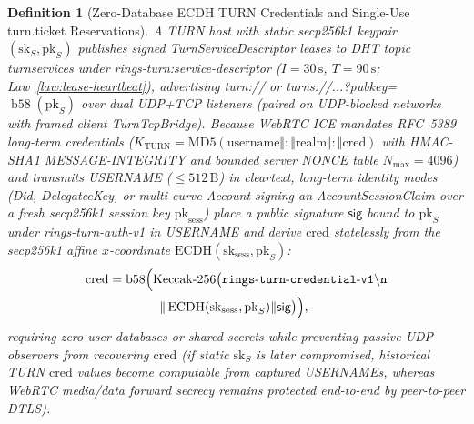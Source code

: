 \documentclass[journal]{IEEEtran}
\newtheorem{definition}{Definition}
\DeclareRobustCommand{\code}[1]{{\ttfamily\renewcommand{\_}{\textunderscore\allowbreak}#1}}
\begin{document}
\begin{definition}[Zero-Database ECDH TURN Credentials and Single-Use \code{turn.ticket} Reservations]\label{def:turn-ticket}
A TURN host with static secp256k1 keypair $(\mathrm{sk}_S,\mathrm{pk}_S)$ publishes signed \code{TurnServiceDescriptor} leases to DHT topic \code{turn\_services} under \code{rings-turn:service-descriptor} ($I=30\,\mathrm{s}$, $T=90\,\mathrm{s}$; Law~\ref{law:lease-heartbeat}), advertising \code{turn://} or \code{turns://...?pubkey=}$\operatorname{b58}(\mathrm{pk}_S)$ over dual UDP+TCP listeners (paired on UDP-blocked networks with framed client \code{TurnTcpBridge}). Because WebRTC ICE mandates RFC~5389 long-term credentials ($K_{\mathrm{TURN}}=\mathrm{MD5}(\mathrm{username}\Vert\mathtt{:}\Vert\mathrm{realm}\Vert\mathtt{:}\Vert\mathrm{cred})$ with \code{HMAC-SHA1} \code{MESSAGE-INTEGRITY} and bounded server \code{NONCE} table $N_{\max}=4096$) and transmits \code{USERNAME} ($\le 512\,\mathrm{B}$) in cleartext, long-term identity modes (\code{Did}, \code{DelegateeKey}, or multi-curve \code{Account} signing an \code{AccountSessionClaim} over a fresh secp256k1 session key $\mathrm{pk}_{\mathrm{sess}}$) place a public signature $\mathsf{sig}$ bound to $\mathrm{pk}_S$ under \code{rings-turn-auth-v1} in \code{USERNAME} and derive $\mathrm{cred}$ statelessly from the secp256k1 affine $x$-coordinate $\mathrm{ECDH}(\mathrm{sk}_{\mathrm{sess}},\mathrm{pk}_S)$:
\[
\begin{aligned}
  \mathrm{cred} &= \operatorname{b58}\Bigl(\mathrm{Keccak\text{-}256}\bigl(\mathtt{rings\mbox{-}turn\mbox{-}credential\mbox{-}v1\backslash n}\\
  &\qquad\qquad\Vert\,\mathrm{ECDH}(\mathrm{sk}_{\mathrm{sess}},\mathrm{pk}_S)\Vert\mathsf{sig}\bigr)\Bigr),
\end{aligned}
\]
requiring zero user databases or shared secrets while preventing passive UDP observers from recovering $\mathrm{cred}$ (if static $\mathrm{sk}_S$ is later compromised, historical TURN $\mathrm{cred}$ values become computable from captured \code{USERNAME}s, whereas WebRTC media/data forward secrecy remains protected end-to-end by peer-to-peer DTLS).


\end{definition}
\end{document}
